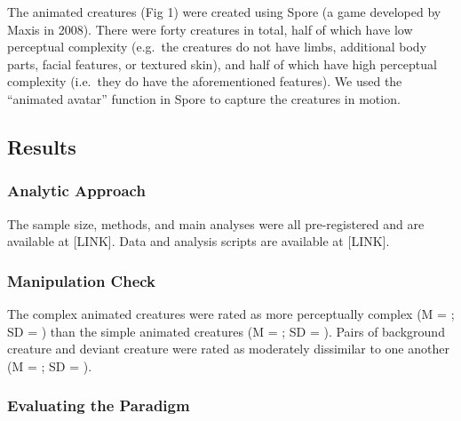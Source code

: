 \documentclass[10pt, letterpaper]{article}
\begin{document}
The animated creatures (Fig 1) were created using Spore (a game
developed by Maxis in 2008). There were forty creatures in total, half
of which have low perceptual complexity (e.g.~the creatures do not have
limbs, additional body parts, facial features, or textured skin), and
half of which have high perceptual complexity (i.e.~they do have the
aforementioned features). We used the ``animated avatar'' function in
Spore to capture the creatures in motion.

\hypertarget{results}{%
\subsection{Results}\label{results}}

\hypertarget{analytic-approach}{%
\subsubsection{Analytic Approach}\label{analytic-approach}}

The sample size, methods, and main analyses were all pre-registered and
are available at {[}LINK{]}. Data and analysis scripts are available at
{[}LINK{]}.

\hypertarget{manipulation-check}{%
\subsubsection{Manipulation Check}\label{manipulation-check}}

The complex animated creatures were rated as more perceptually complex
(M = ; SD = ) than the simple animated creatures (M = ; SD = ). Pairs of
background creature and deviant creature were rated as moderately
dissimilar to one another (M = ; SD = ).

\hypertarget{evaluating-the-paradigm}{%
\subsubsection{Evaluating the Paradigm}\label{evaluating-the-paradigm}}
\end{document}
